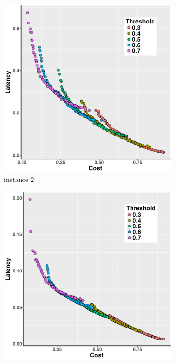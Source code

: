 \documentclass[10pt,journal,compsoc]{IEEEtran}
\begin{document}
\begin{figure}[h!]
   \centering
   \begin{subfigure}{0.49\linewidth}
       \includegraphics[width=\textwidth]{pics/static_threshold_problem_2.png}
    \caption{instance 2}
   \end{subfigure}
   \begin{subfigure}{0.49\linewidth}
       \includegraphics[width=\textwidth]{pics/static_threshold_problem_3.png}

\end{subfigure}
\end{figure}
\end{document}
